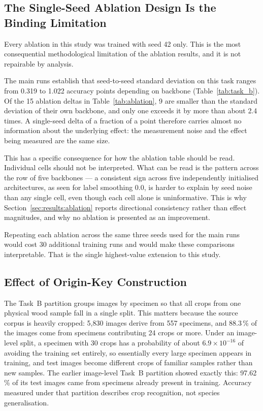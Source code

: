\subsection{The Single-Seed Ablation Design Is the Binding Limitation}
\label{sec:discussion:oneseed}

Every ablation in this study was trained with seed 42 only. This is the most
consequential methodological limitation of the ablation results, and it is
not repairable by analysis.

The main runs establish that seed-to-seed standard deviation on this task
ranges from 0.319 to 1.022 accuracy points depending on backbone
(Table~\ref{tab:task_b}). Of the 15 ablation deltas in
Table~\ref{tab:ablation}, 9 are smaller than the standard deviation of their
own backbone, and only one exceeds it by more than about 2.4 times. A
single-seed delta of a fraction of a point therefore carries almost no
information about the underlying effect: the measurement noise and the
effect being measured are the same size.

This has a specific consequence for how the ablation table should be read.
Individual cells should not be interpreted. What can be read is the pattern
across the row of five backbones --- a consistent sign across five
independently initialised architectures, as seen for label smoothing 0.0, is
harder to explain by seed noise than any single cell, even though each cell
alone is uninformative. This is why Section~\ref{sec:results:ablation}
reports directional consistency rather than effect magnitudes, and why no
ablation is presented as an improvement.

Repeating each ablation across the same three seeds used for the main runs
would cost 30 additional training runs and would make these comparisons
interpretable. That is the single highest-value extension to this study.

\subsection{Effect of Origin-Key Construction}
\label{sec:discussion:originkey}

The Task~B partition groups images by specimen so that all crops from one
physical wood sample fall in a single split. This matters because the source
corpus is heavily cropped: 5{,}830 images derive from 557 specimens, and
88.3\,\% of the images come from specimens contributing 24 crops or more.
Under an image-level split, a specimen with 30 crops has a probability of
about $6.9\times10^{-16}$ of avoiding the training set entirely, so
essentially every large specimen appears in training, and test images become
different crops of familiar samples rather than new samples. The earlier
image-level Task~B partition showed exactly this: 97.62\,\% of its test
images came from specimens already present in training. Accuracy measured
under that partition describes crop recognition, not species generalisation.

